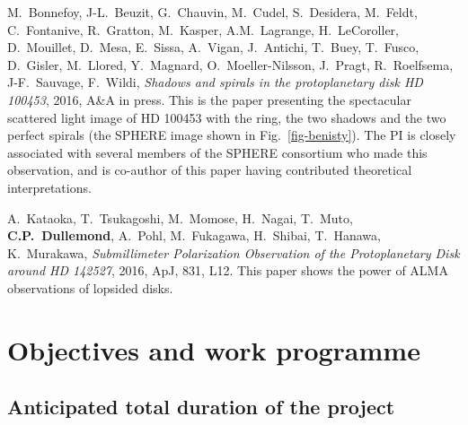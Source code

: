 \documentclass[10pt,fleqn,twoside]{article}
\begin{document}
\begin{literature}
  M.~Bonnefoy, J-L.~Beuzit, G.~Chauvin, M.~Cudel, S.~Desidera, M.~Feldt,
  C.~Fontanive, R.~Gratton, M.~Kasper, A.M.~Lagrange, H.~LeCoroller,
  D.~Mouillet, D.~Mesa, E.~Sissa, A.~Vigan, J.~Antichi, T.~Buey, T.~Fusco,
  D.~Gisler, M.~Llored, Y.~Magnard, O.~Moeller-Nilsson, J.~Pragt,
  R.~Roelfsema, J-F.~Sauvage, F.~Wildi, {\em Shadows and spirals in the
    protoplanetary disk HD 100453}, 2016, A\&A in press. This is the paper
  presenting the spectacular scattered light image of HD 100453 with the
  ring, the two shadows and the two perfect spirals (the SPHERE image shown
  in Fig.~\ref{fig-benisty}). The PI is closely associated with several
  members of the SPHERE consortium who made this observation, and is
  co-author of this paper having contributed theoretical interpretations.
\item A.~Kataoka, T.~Tsukagoshi, M.~Momose, H.~Nagai, T.~Muto, {\bf
    C.P.~Dullemond}, A.~Pohl, M.~Fukagawa, H.~Shibai, T.~Hanawa,
  K.~Murakawa, {\em Submillimeter Polarization Observation of the
    Protoplanetary Disk around HD 142527}, 2016, ApJ, 831, L12. This paper
  shows the power of ALMA observations of lopsided disks.
\end{literature}



% 
% 
% 
% 

\section{Objectives and work programme}
\renewcommand{\leftmark}{\sc Objectives and work programme}


\subsection{Anticipated total duration of the project}
\end{document}
